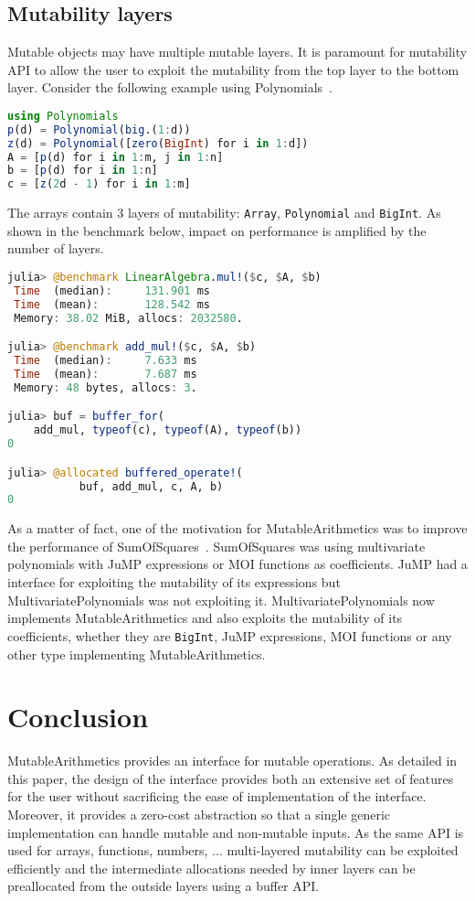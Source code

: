 \documentclass{juliacon}
\newcommand{\ma}{MutableArithmetics}
\begin{document}
\subsection{Mutability layers}
Mutable objects may have multiple mutable layers.
It is paramount for mutability API to allow the user to exploit
the mutability from the top layer to the bottom layer.
Consider the following example using Polynomials~\cite{verzani2021polynomials}.
\begin{lstlisting}[language = Julia]
using Polynomials
p(d) = Polynomial(big.(1:d))
z(d) = Polynomial([zero(BigInt) for i in 1:d])
A = [p(d) for i in 1:m, j in 1:n]
b = [p(d) for i in 1:n]
c = [z(2d - 1) for i in 1:m]
\end{lstlisting}
The arrays contain 3 layers of mutability:
\lstinline|Array|, \lstinline|Polynomial| and \lstinline|BigInt|.
As shown in the benchmark below,
impact on performance is amplified by the number of layers.
\begin{lstlisting}[language = Julia]
julia> @benchmark LinearAlgebra.mul!($c, $A, $b)
 Time  (median):     131.901 ms
 Time  (mean):       128.542 ms
 Memory: 38.02 MiB, allocs: 2032580.

julia> @benchmark add_mul!($c, $A, $b)
 Time  (median):     7.633 ms
 Time  (mean):       7.687 ms
 Memory: 48 bytes, allocs: 3.

julia> buf = buffer_for(
    add_mul, typeof(c), typeof(A), typeof(b))
0

julia> @allocated buffered_operate!(
           buf, add_mul, c, A, b)
0
\end{lstlisting}

As a matter of fact, one of the motivation for \ma{}
was to improve the performance of SumOfSquares~\cite{legat2020sumofsquares}.
SumOfSquares was using multivariate polynomials with
JuMP expressions or MOI functions as coefficients.
JuMP had a interface for exploiting the mutability of its expressions
but MultivariatePolynomials was not exploiting it.
MultivariatePolynomials now implements \ma{}
and also exploits the mutability of its coefficients, whether they are \lstinline|BigInt|, JuMP expressions, MOI functions or any other type implementing \ma{}.

\section{Conclusion}
\ma{} provides an interface for mutable operations.
As detailed in this paper, the design of the interface provides
both an extensive set of features for the user without sacrificing
the ease of implementation of the interface.
Moreover, it provides a zero-cost abstraction so that a single generic
implementation can handle mutable and non-mutable inputs.
As the same API is used for arrays, functions, numbers, ... multi-layered mutability can be exploited efficiently
and the intermediate allocations needed by inner layers can be
preallocated from the outside layers using a buffer API.


\end{document}
